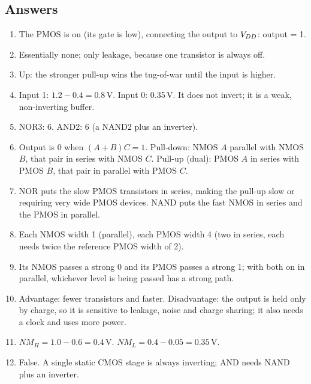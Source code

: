 \subsection*{Answers}
\begin{enumerate}
  \item The PMOS is on (its gate is low), connecting the output to $V_{DD}$: output = 1.
  \item Essentially none; only leakage, because one transistor is always off.
  \item Up: the stronger pull-up wins the tug-of-war until the input is higher.
  \item Input 1: $1.2 - 0.4 = 0.8$\,V. Input 0: 0.35\,V. It does not invert; it is a weak, non-inverting buffer.
  \item NOR3: 6. AND2: 6 (a NAND2 plus an inverter).
  \item Output is 0 when $(A + B)C = 1$. Pull-down: NMOS $A$ parallel with NMOS $B$, that pair in series with NMOS $C$. Pull-up (dual): PMOS $A$ in series with PMOS $B$, that pair in parallel with PMOS $C$.
  \item NOR puts the slow PMOS transistors in series, making the pull-up slow or requiring very wide PMOS devices. NAND puts the fast NMOS in series and the PMOS in parallel.
  \item Each NMOS width 1 (parallel), each PMOS width 4 (two in series, each needs twice the reference PMOS width of 2).
  \item Its NMOS passes a strong 0 and its PMOS passes a strong 1; with both on in parallel, whichever level is being passed has a strong path.
  \item Advantage: fewer transistors and faster. Disadvantage: the output is held only by charge, so it is sensitive to leakage, noise and charge sharing; it also needs a clock and uses more power.
  \item $NM_H = 1.0 - 0.6 = 0.4$\,V. $NM_L = 0.4 - 0.05 = 0.35$\,V.
  \item False. A single static CMOS stage is always inverting; AND needs NAND plus an inverter.
\end{enumerate}
